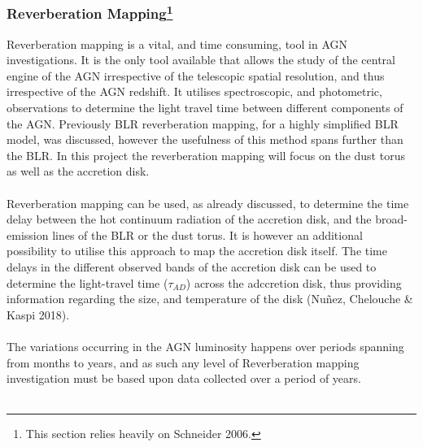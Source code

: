 \documentclass[a4paper, 12pt, twoside]{article}
\begin{document}
\subsubsection[Reverberation Mapping]{Reverberation Mapping\footnote{This section relies heavily on Schneider 2006.}}
Reverberation mapping is a vital, and time consuming, tool in AGN investigations. It is the only tool available  that allows the study of the central engine of the AGN irrespective of the telescopic spatial resolution, and thus irrespective of the AGN redshift. It utilises spectroscopic, and photometric, observations to determine the light travel time between different components of the AGN. Previously BLR reverberation mapping, for a highly simplified BLR model, was discussed, however the usefulness of this method spans further than the BLR. In this project the reverberation mapping will focus on the dust torus as well as the accretion disk. \\
\\
Reverberation mapping can be used, as already discussed, to determine the time delay between the hot continuum radiation of the accretion disk, and the broad-emission lines of the BLR or the dust torus. It is however an additional possibility to utilise this approach to map the accretion disk itself. The time delays in the different observed bands of the accretion disk can be used to determine the light-travel time ($\tau_{AD}$) across the adccretion disk, thus providing information regarding the size, and temperature of the disk (Nuñez, Chelouche \& Kaspi 2018). \\
\\
The variations occurring in the AGN luminosity happens over periods spanning from months to years, and as such any level of Reverberation mapping investigation must be based upon data collected over a period of years. \\
\\
\end{document}
